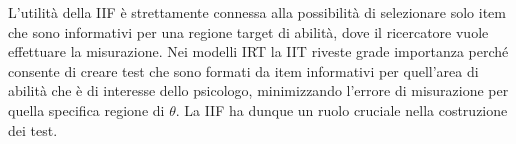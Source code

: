 L'utilità della IIF è strettamente connessa alla possibilità di selezionare solo item che sono informativi per una regione target di abilità, dove il ricercatore vuole effettuare la misurazione. Nei modelli IRT la IIT riveste grade importanza perché consente di creare test che sono formati da item informativi per quell'area di abilità che è di interesse dello psicologo, minimizzando l'errore di misurazione per quella specifica regione di $\theta$. La IIF ha dunque un ruolo cruciale nella costruzione dei test.








